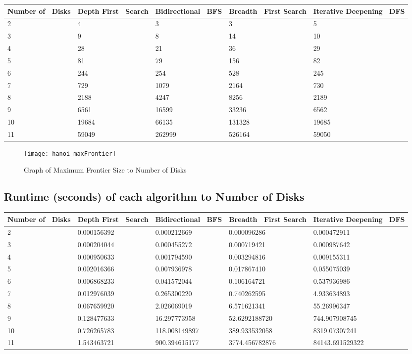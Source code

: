 \documentclass[conference]{IEEEtran}
\begin{document}
\begin{tabular}{ | p{0.97cm} | p{1cm} | p{2cm} | p{1cm} | p{1.2cm} |}
    \hline
    Number of \ Disks & Depth First \ Search & Bidirectional \ BFS & Breadth \ First Search & Iterative Deepening \ DFS \\ \hline
    2 & 4 & 3 & 3 & 5 \\ \hline
    3 & 9 & 8 & 14 & 10 \\ \hline
    4 & 28 & 21 & 36 & 29 \\ \hline
    5 & 81 & 79 & 156 & 82 \\ \hline
    6 & 244 & 254 & 528 & 245 \\ \hline
    7 & 729 & 1079 & 2164 & 730 \\ \hline
    8 & 2188 & 4247 & 8256 & 2189 \\ \hline
    9 & 6561 & 16599 & 33236 & 6562 \\ \hline
    10 & 19684 & 66135 & 131328 & 19685 \\ \hline
    11 & 59049 & 262999 & 526164 & 59050 \\ \hline
\end{tabular}

\begin{figure}
\centering
\texttt{[image: hanoi\_maxFrontier]}
\caption{Graph of Maximum Frontier Size to Number of Disks }
\label{fig:my_label}
\end{figure}

\begin{table*}[t]
\subsection{Runtime (seconds) of each algorithm to Number of Disks}
\begin{tabular}{ |l |l |l |l |l |}
    \hline
    Number of \ Disks & Depth First \ Search & Bidirectional \ BFS & Breadth \ First Search & Iterative Deepening \ DFS \\ \hline
    2 & 0.000156392 & 0.000212669 & 0.000096286 & 0.000472911 \\ \hline
    3 & 0.000204044 & 0.000455272 & 0.000719421 & 0.000987642 \\ \hline
    4 & 0.000950633 & 0.001794590 & 0.003294816 & 0.009155311 \\ \hline
    5 & 0.002016366 & 0.007936978 & 0.017867410 & 0.055075039 \\ \hline
    6 & 0.006868233 & 0.041572044 & 0.106164721 & 0.537936986 \\ \hline
    7 & 0.012976039 & 0.265300220 & 0.740262595 & 4.933634893 \\ \hline
    8 & 0.067659920 & 2.026069019 & 6.571621341 & 55.26996347 \\ \hline
    9 & 0.128477633 & 16.297773958 & 52.6292188720 & 744.907908745 \\ \hline
    10 & 0.726265783 & 118.008149897 & 389.933532058 & 8319.07307241 \\ \hline
    11 & 1.543463721 & 900.394615177 & 3774.456782876 & 84143.691529322 \\ \hline
\end{tabular}
\end{table*}
\end{document}
